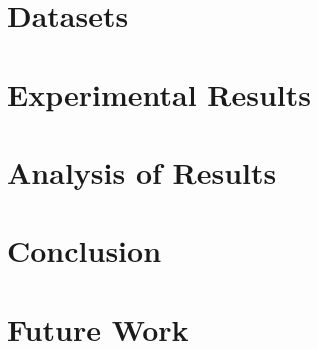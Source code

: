 \documentclass[10pt,twocolumn,letterpaper]{article}
\begin{document}





\section{Datasets}


\section{Experimental Results}


\section{Analysis of Results}


\section{Conclusion}


\section{Future Work}




{\small


}
\end{document}
